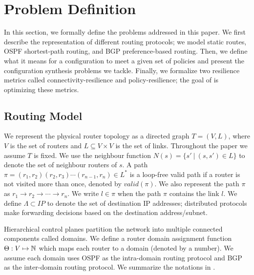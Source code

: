 \section{Problem Definition}
In this section, we formally define the problems addressed in this
paper.  We first describe the representation of different
routing protocols; we model static
routes, OSPF shortest-path routing, and BGP preference-based routing.
Then, we define what it means for a configuration to meet a given
set of policies and present the configuration synthesis problems
we tackle.
Finally, we formalize two resilience metrics called 
connectivity-resilience and policy-resilience; the goal 
of \name is optimizing these metrics. 

\subsection{Routing Model} \label{sec:routingmodel}

We represent the physical router topology as a directed graph $T=(V, L)$,
where $V$ is the set of routers and $L\subseteq V\times V$ is the set of links. 
Throughout the paper we assume $T$ is fixed.
We use the neighbour function $N(s) = \{s'\ | \ (s,s') \in L \}$ to denote 
the set of neighbour routers of $s$. 
A path $\pi = (r_1,r_2) (r_2, r_3) \cdots (r_{n-1}, r_n) \in L^*$ is a 
loop-free valid path if
a router is not visited more than once, denoted by $valid(\pi)$.
We also represent the path $\pi$ as 
$r_1\rightarrow r_2 \rightarrow  \cdots \rightarrow r_n$.
We write $l \in \pi$ when the path $\pi$ contains the link $l$. 
We define $\Lambda \subset IP$ to denote the set of 
destination IP addresses;
distributed protocols make forwarding decisions based on the 
destination address/subnet.

Hierarchical control planes partition the
network into multiple connected components called domains. 
We define a router domain assignment function
$\Theta: V \mapsto \mathbb{N}$ which maps each router to a domain 
(denoted by a number). We assume 
each domain uses OSPF as the intra-domain routing protocol
and BGP as the inter-domain routing protocol. We summarize
the notations in . 


